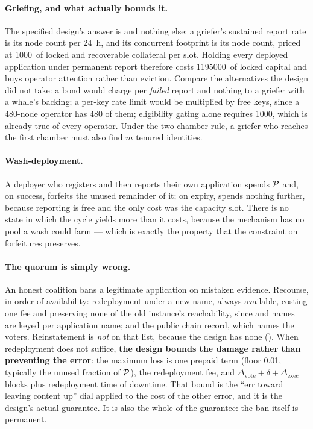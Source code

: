 \paragraph{Griefing, and what actually bounds it.} The specified design's answer is
 and nothing else: a griefer's sustained report rate is its node count per
\SI{24}{\hour}, and its concurrent footprint is its node count, priced at \num{1000}\flux\ of
locked and recoverable collateral per slot. Holding every deployed application under permanent
report therefore costs \num{1195000}\flux\ of locked capital and buys operator attention rather than
eviction. Compare the alternatives the design did not take: a bond would charge per \emph{failed}
report and nothing to a griefer with a whale's backing; a per-key rate limit would be multiplied by
free keys, since a 480-node operator has 480 of them; eligibility gating alone requires
\num{1000}\flux, which is already true of every operator. Under the two-chamber rule, a griefer
who reaches the first chamber must also find $m$ tenured identities.

\paragraph{Wash-deployment.} A deployer who registers and then reports their own application spends
$\mathcal{P}$ and, on success, forfeits the unused remainder of it; on expiry, spends nothing further,
because reporting is free and the only cost was the capacity slot. There is no state in which the
cycle yields more than it costs, because the mechanism has no pool a wash could farm — which is
exactly the property that the  constraint on forfeitures preserves.

\paragraph{The quorum is simply wrong.} An honest coalition bans a legitimate application on
mistaken evidence. Recourse, in order of availability: redeployment under a new name, always
available, costing one fee and preserving none of the old instance's reachability, since \FDM{} and
\PDNS{} names are keyed per application name; and the public chain record, which names the voters.
Reinstatement is \emph{not} on that list, because the design has none
(). When redeployment does not suffice, \textbf{the design bounds the
damage rather than preventing the error}: the maximum loss is one prepaid term (floor
\num{0.01}\flux, typically the unused fraction of $\mathcal{P}$), the redeployment fee, and
$\Delta_{\mathrm{vote}} + \delta + \Delta_{\mathrm{exec}}$ blocks plus redeployment time of
downtime. That bound is the ``err toward leaving content up'' dial applied to the cost of the other
error, and it is the design's actual guarantee. It is also the whole of the guarantee: the ban
itself is permanent.

